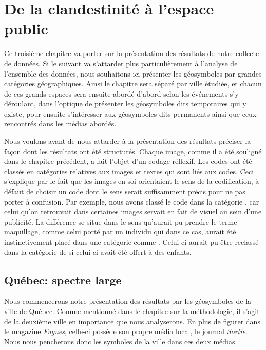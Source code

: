 
\chapter{De la clandestinité à l'espace public}
\label{cha:de_la_clandestinite_a_l_espace_public}

Ce troisième chapitre va porter sur la présentation des résultats de notre collecte de données.
Si le suivant va s'attarder plus particulièrement à l'analyse de l'ensemble des données, nous souhaitons ici présenter les géosymboles par grandes catégories géographiques.
Ainsi le chapitre sera séparé par ville étudiée, et chacun de ces grands espaces sera ensuite abordé d'abord selon les événements s'y déroulant, dans l'optique de présenter les géosymboles dits temporaires qui y existe, pour ensuite s'intéresser aux géosymboles dits permanents ainsi que ceux rencontrés dans les médias abordés.

Nous voulons avant de nous attarder à la présentation des résultats préciser la façon dont les résultats ont été structurés.
Chaque image, comme il a été souligné dans le chapitre précédent, a fait l'objet d'un codage réflexif.
Les codes ont été classés en catégories relatives aux images et textes qui sont liés aux codes.
Ceci s'explique par le fait que les images en soi orientaient le sens de la codification, à défaut de choisir un code dont le sens serait suffisamment précis pour ne pas porter à confusion.
Par exemple, nous avons classé le code  dans la catégorie , car celui qu'on retrouvait dans certaines images servait en fait de visuel au sein d'une publicité.
La différence se situe dans le sens qu'aurait pu prendre le terme maquillage, comme celui porté par un individu qui dans ce cas, aurait été instinctivement placé dans une catégorie comme .
Celui-ci aurait pu être reclassé dans la catégorie de  si celui-ci avait été offert à des enfants.

\section{Québec: spectre large}
\label{sec:qu_bec_spectre_large}

Nous commencerons notre présentation des résultats par les géosymboles de la ville de Québec.
Comme mentionné dans le chapitre sur la méthodologie, il s'agit de la deuxième ville en importance que nous analyserons.
En plus de figurer dans le magazine \emph{Fugues}, celle-ci possède son propre média local, le journal \emph{Sortie}.
Nous nous pencherons donc les symboles de la ville dans ces deux médias.

